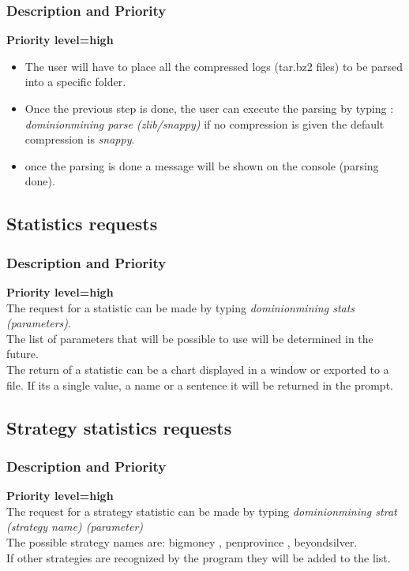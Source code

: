 \documentclass{scrreprt}
\begin{document}
\subsubsection{Description and Priority}
\textbf{Priority level=high}\\
\begin{itemize}
  \item The user will have to place all the compressed logs (tar.bz2 files) to be parsed into a
    specific folder.
  \item Once the previous step is done, the user can execute the parsing by
      typing : \textit{dominionmining parse (zlib/snappy)} if no compression is
      given the default compression is \textit{snappy}.
      \item once the parsing is done a message will be shown on the
        console (parsing done).
\end{itemize}

\subsection{Statistics requests}
\subsubsection{Description and Priority}
\textbf{Priority level=high}\\
The request for a statistic can be made by typing \textit{dominionmining stats (parameters)}.  \\
The list of parameters that will be possible to use will be determined in the
future.\\

The return of a statistic can be a chart displayed in a window or exported to a
file. If its a single value, a name or a sentence it will be returned in the prompt.

\subsection{Strategy statistics requests}
\subsubsection{Description and Priority}
\textbf{Priority level=high}\\
The request for a strategy statistic can be made by typing \textit{dominionmining strat (strategy name) (parameter)}\\
The possible strategy names are:
bigmoney , penprovince , beyondsilver.\\
If other strategies are recognized by the program they will be added to the list.
\end{document}
